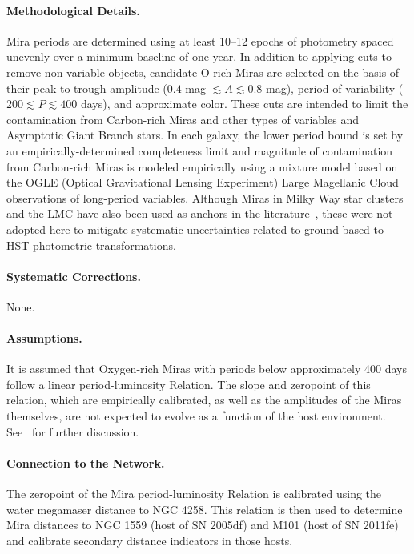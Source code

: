 \paragraph{Methodological Details.}
Mira periods are determined using at least 10--12 epochs of photometry spaced unevenly over a minimum baseline of one year. In addition to applying cuts to remove non-variable objects, candidate O-rich Miras are selected on the basis of their peak-to-trough amplitude ($0.4$ mag $ \lesssim A \lesssim 0.8$ mag), period of variability ($200 \lesssim  P \lesssim 400$ days), and approximate color.  These cuts are intended to limit the contamination from Carbon-rich Miras and other types of variables and Asymptotic Giant Branch stars. In each galaxy, the lower period bound is set by an empirically-determined completeness limit and magnitude of contamination from Carbon-rich Miras is modeled empirically using a mixture model based on the OGLE (Optical Gravitational Lensing Experiment) Large Magellanic Cloud observations of long-period variables. Although Miras in Milky Way star clusters and the LMC have also been used as anchors in the literature~\citep[e.g.][]{2025ApJ...990...63B}, these were not adopted here to mitigate systematic uncertainties related to ground-based to HST photometric transformations. 

\paragraph{Systematic Corrections.} None.

\paragraph{Assumptions.} 
It is assumed that Oxygen-rich Miras with periods below approximately 400 days follow a linear period-luminosity Relation. The slope and zeropoint of this relation, which are empirically calibrated, as well as the amplitudes of the Miras themselves, are not expected to evolve as a function of the host environment. See~\citet{2024ApJ...963...83H} for further discussion.

\paragraph{Connection to the Network.} The zeropoint of the Mira period-luminosity Relation is calibrated using the water megamaser distance to NGC 4258. This relation is then used to determine Mira distances to NGC 1559 (host of SN 2005df) and M101 (host of SN 2011fe) and calibrate secondary distance indicators in those hosts. 


